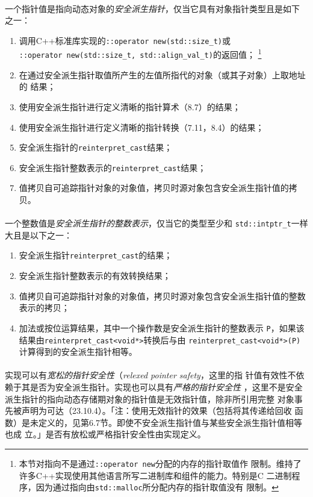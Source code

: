 \paragraph{}
一个指针值是指向动态对象的\textit{安全派生指针}，仅当它具有对象指针类型且是如下
之一：
\begin{enumerate}
  \item{调用C++标准库实现的\texttt{::operator new(std::size\_t)}或 \\
    \texttt{::operator new(std::size\_t, std::align\_val\_t)}的返回值；
      \footnote{本节对指向不是通过\texttt{::operator new}分配的内存的指针取值作
        限制。维持了许多C++实现使用其他语言所写二进制库和组件的能力。特别是C
        二进制程序，因为通过指向由\texttt{std::malloc}所分配内存的指针取值没有
        限制。}}
  \item{在通过安全派生指针取值所产生的左值所指代的对象（或其子对象）上取地址的
    结果；}
  \item{使用安全派生指针进行定义清晰的指针算术（8.7）的结果；}
  \item{使用安全派生指针进行定义清晰的指针转换（7.11，8.4）的结果；}
  \item{安全派生指针的\texttt{reinterpret\_cast}结果；}
  \item{安全派生指针整数表示的\texttt{reinterpret\_cast}结果；}
  \item{值拷贝自可追踪指针对象的对象值，拷贝时源对象包含安全派生指针值的拷贝。}
\end{enumerate}

\paragraph{}
一个整数值是\textit{安全派生指针的整数表示}，仅当它的类型至少和
\texttt{std::intptr\_t}一样大且是以下之一：
\begin{enumerate}
  \item{安全派生指针\texttt{reinterpret\_cast}的结果；}
  \item{安全派生指针整数表示的有效转换结果；}
  \item{值拷贝自可追踪指针对象的对象值，拷贝时源对象包含安全派生指针值的整数
      表示的拷贝；}
    \item{加法或按位运算结果，其中一个操作数是安全派生指针的整数表示
      \texttt{P}，如果该结果由\texttt{reinterpret\_cast<void*>}转换后与由
    \texttt{reinterpret\_cast<void*>(P)}计算得到的安全派生指针相等。}
\end{enumerate}

\paragraph{}
实现可以有\textit{宽松的指针安全性}（\textit{relexed pointer safety}，这里的指
针值有效性不依赖于其是否为安全派生指针。实现也可以具有\textit{严格的指针安全性}
，这里不是安全派生指针的指向动态存储期对象的指针值是无效指针值，除非所引用完整
对象事先被声明为可达（23.10.4）。「注：使用无效指针的效果（包括将其传递给回收
函数）是未定义的，见第6.7节。即使不安全派生指针值与某些安全派生指针值相等也成
立。」是否有放松或严格指针安全性由实现定义。

